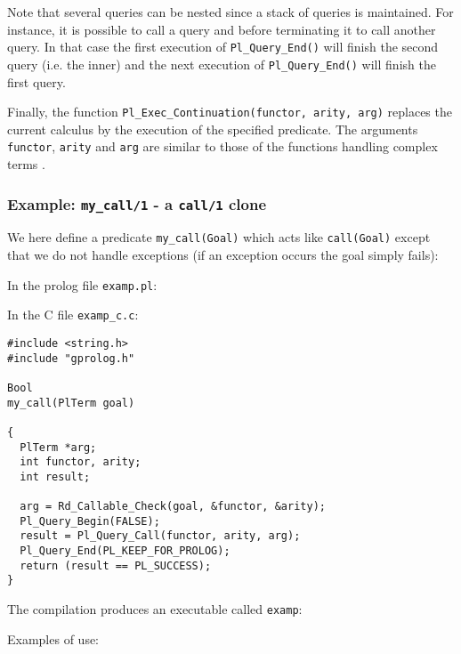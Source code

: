 Note that several queries can be nested since a stack of queries is
maintained. For instance, it is possible to call a query and before
terminating it to call another query. In that case the first execution of
\texttt{Pl\_Query\_End()} will finish the second query (i.e. the inner) and
the next execution of \texttt{Pl\_Query\_End()} will finish the first query.

Finally, the function \texttt{Pl\_Exec\_Continuation(functor, arity,
arg)} replaces the current calculus by the execution of the specified
predicate. The arguments \texttt{functor}, \texttt{arity} and
\texttt{arg} are similar to those of the functions handling complex
terms .

\subsubsection{Example: \texttt{my\_call/1} - a \texttt{call/1} clone}

We here define a predicate \texttt{my\_call(Goal)} which acts like
\texttt{call(Goal)} except that we do not handle exceptions (if an exception
occurs the goal simply fails):

In the prolog file \texttt{examp.pl}:


In the C file \texttt{examp\_c.c}:

\begin{Indentation}
\begin{verbatim}
#include <string.h>
#include "gprolog.h"

Bool
my_call(PlTerm goal)

{
  PlTerm *arg;
  int functor, arity;
  int result;

  arg = Rd_Callable_Check(goal, &functor, &arity);
  Pl_Query_Begin(FALSE);
  result = Pl_Query_Call(functor, arity, arg);
  Pl_Query_End(PL_KEEP_FOR_PROLOG);
  return (result == PL_SUCCESS);
}
\end{verbatim}
\end{Indentation}

The compilation produces an executable called \texttt{examp}:


Examples of use:

\begin{CodeTwoCols}
\SkipLine
{}
\SkipLine
{}
\SkipLine
{}
\SkipLine
{}
\SkipLine
{}
\SkipLine
{}
\SkipLine
{}
\end{CodeTwoCols}

